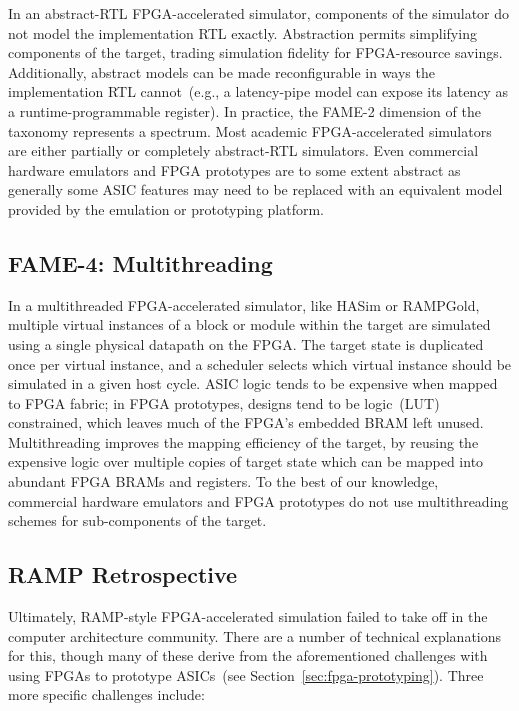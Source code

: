 In an abstract-RTL FPGA-accelerated simulator, components of the simulator do
not model the implementation RTL exactly. Abstraction permits simplifying
components of the target, trading simulation fidelity for FPGA-resource
savings. Additionally, abstract models can be made reconfigurable in ways the
implementation RTL cannot~(e.g., a latency-pipe model can expose its latency
as a runtime-programmable register). In practice, the FAME-2 dimension of the taxonomy
represents a spectrum.  Most academic FPGA-accelerated simulators
are either partially or completely abstract-RTL simulators. Even commercial
hardware emulators and FPGA prototypes are to some extent abstract as
generally some ASIC features may need to be replaced with an equivalent model
provided by the emulation or prototyping platform.

\subsection{FAME-4: Multithreading}

In a multithreaded FPGA-accelerated simulator, like HASim or RAMPGold, multiple virtual instances of a
block or module within the target are simulated using a single physical
datapath on the FPGA. The target state is duplicated once per virtual instance, and a scheduler selects which virtual instance should be
simulated in a given host cycle. ASIC logic tends to be expensive when mapped
to FPGA fabric; in FPGA prototypes, designs tend to be logic~(LUT) constrained,
which leaves much of the FPGA's embedded BRAM left unused.  Multithreading
improves the mapping efficiency of the target, by reusing the expensive logic
over multiple copies of target state which can be mapped into abundant FPGA BRAMs and registers.
To the best of our knowledge, commercial hardware
emulators and FPGA prototypes do not use multithreading schemes for sub-components of the target.

\subsection{RAMP Retrospective}

Ultimately, RAMP-style FPGA-accelerated simulation failed to take off
in the computer architecture community. There are a number of technical explanations for this, though many of these
derive from the aforementioned challenges with using FPGAs to prototype ASICs~(see Section~\ref{sec:fpga-prototyping}).
Three more specific challenges include:

